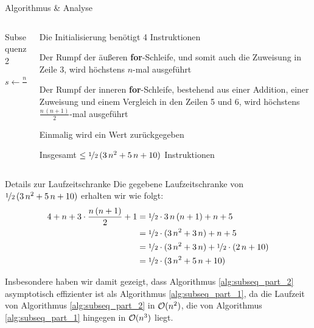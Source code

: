 \begin{frame}{Algorithmus \& Analyse}
\begin{columns}[T,onlytextwidth]
\begin{column}{0.43\textwidth}
\vspace{-5pt}
\begin{algorithm}[H]
	\caption{Subsequenz 2}
	\label{alg:subseq_part_2}
	\DontPrintSemicolon
	$s \gets \frac{n \, (n+1)}{4}$\;
    \Return{\False}
\end{algorithm}
\end{column}
\begin{column}{0.51\textwidth}
    Die Initialisierung ben\"otigt 4 Instruktionen
    
    \medskip
    
    Der Rumpf der \"au{\ss}eren \textbf{for}-Schleife, und somit auch die Zuweisung in Zeile 3, wird h\"ochstens $n$-mal ausgef\"uhrt
    
    \medskip
    
    Der Rumpf der inneren \textbf{for}-Schleife, bestehend aus einer Addition, einer Zuweisung und einem Vergleich in den Zeilen 5 und 6, wird h\"ochstens $\frac{n \, (n+1)}{2}$-mal ausgef\"uhrt
    
    \medskip
    
    Einmalig wird ein Wert zur\"uckgegeben
    
    \medskip
    
    Insgesamt $\leq \nicefrac{1}{2} \, (3 \, n^2 + 5 \, n + 10)$ Instruktionen
\end{column}
\end{columns}
\end{frame}

\begin{frame}{Details zur Laufzeitschranke}
    Die gegebene Laufzeitschranke von $\nicefrac{1}{2} \, (3 \, n^2 + 5 \, n + 10)$ erhalten wir wie folgt:
    \begin{align*}
        4 + n + 3 \cdot \frac{n \, (n+1)}{2} + 1 &= \nicefrac{1}{2} \cdot 3 \, n \, (n+1) + n + 5 \\
        &= \nicefrac{1}{2} \cdot (3 \, n^2 + 3\, n) + n + 5 \\
        &= \nicefrac{1}{2} \cdot (3 \, n^2 + 3\, n) + \nicefrac{1}{2} \cdot (2 \, n + 10) \\
        &= \nicefrac{1}{2} \cdot (3 \, n^2 + 5\, n + 10)
    \end{align*}

    \begin{remark}
    Insbesondere haben wir damit gezeigt, dass Algorithmus \ref{alg:subseq_part_2} \alert{asymptotisch effizienter} ist als Algorithmus \ref{alg:subseq_part_1}, da die Laufzeit von Algorithmus \ref{alg:subseq_part_2} in $\mathcal{O}(n^2)$, die von Algorithmus \ref{alg:subseq_part_1} hingegen in $\mathcal{O}(n^3)$ liegt.
    \end{remark}
\end{frame}
